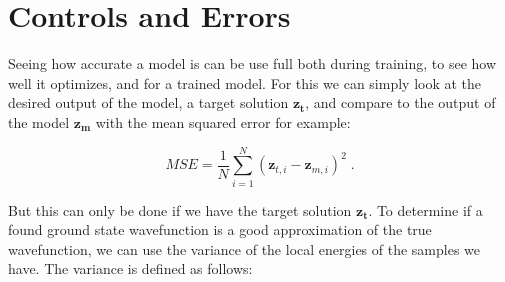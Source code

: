 \section{Controls and Errors}

Seeing how accurate a model is can be use full both during training, to see how well it optimizes, and for a trained model. For this we can simply look at the desired output of the model, a target solution $\boldsymbol{z_t}$, and compare to the output of the model $\boldsymbol{z_m}$ with the mean squared error for example:

\begin{equation} \label{eq:mse}
    MSE = \frac{1}{N} \sum_{i = 1}^N (\boldsymbol{z}_{t, i} - \boldsymbol{z}_{m, i})^2 \; .
\end{equation}

But this can only be done if we have the target solution $\boldsymbol{z_t}$. To determine if a found ground state wavefunction is a good approximation of the true wavefunction, we can use the variance of the local energies of the samples we have. The variance is defined as follows:


